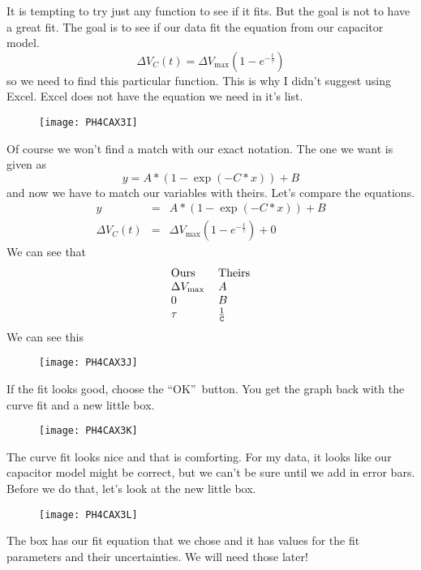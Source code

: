 It is tempting to try just any function to see if it fits. But the goal is
not to have a great fit. The goal is to see if our data fit the equation
from our capacitor model. 
\begin{equation*}
\Delta V_{C}\left( t\right) =\Delta V_{\max }\left( 1-e^{-\frac{t}{\tau }%
}\right)
\end{equation*}%
so we need to find this particular function. This is why I didn't suggest
using Excel. Excel does not have the equation we need in it's list.

\begin{figure}[h!]
\texttt{[image: PH4CAX3I]}
\end{figure}Of course we won't find a match
with our exact notation. The one we want is given as 
\begin{equation*}
y=A\ast (1-\exp (-C\ast x))+B
\end{equation*}%
and now we have to match our variables with theirs. Let's compare the
equations. 
\begin{eqnarray*}
y &=&A\ast (1-\exp (-C\ast x))+B \\
\Delta V_{C}\left( t\right) &=&\Delta V_{\max }\left( 1-e^{-\frac{t}{\tau }%
}\right) +0
\end{eqnarray*}%
We can see that 
\begin{equation*}
\begin{tabular}{ll}
Ours & Theirs \\ 
$\Delta V_{\max }$ & $A$ \\ 
$0$ & $B$ \\ 
$\tau $ & $\frac{1}{\mathtt{C}}$%
\end{tabular}%
\end{equation*}%
We can see this \begin{figure}[h!]
\texttt{[image: PH4CAX3J]}
\end{figure}

If the fit looks good, choose the \textquotedblleft OK\textquotedblright\
button. You get the graph back with the curve fit and a new little box. 
\begin{figure}[h!]
\texttt{[image: PH4CAX3K]}
\end{figure}The curve fit looks nice and that
is comforting. For my data, it looks like our capacitor model might be
correct, but we can't be sure until we add in error bars. Before we do that,
let's look at the new little box. \begin{figure}[h!]
\texttt{[image: PH4CAX3L]}
\end{figure}The box has our fit equation that
we chose and it has values for the fit parameters and their uncertainties.
We will need those later!

